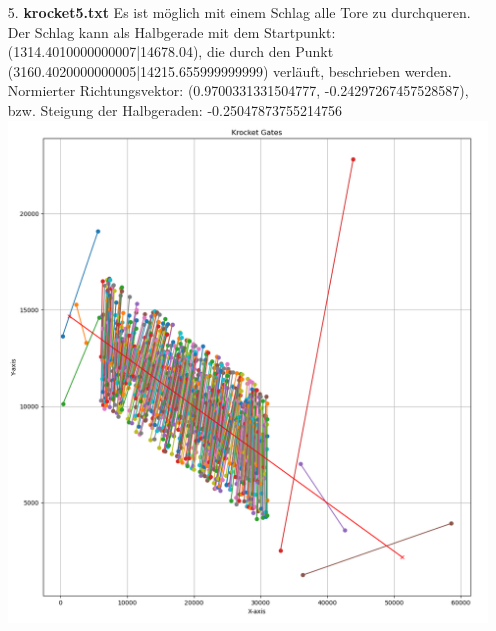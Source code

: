 \documentclass[a4paper,10pt,ngerman]{scrartcl}
\begin{document}
\begin{itemize}
  \item [5.] \textbf{krocket5.txt}
  \newline
  Es ist möglich mit einem Schlag alle Tore zu durchqueren.
  \newline
  Der Schlag kann als Halbgerade mit dem Startpunkt: (1314.4010000000007|14678.04), die durch den Punkt (3160.4020000000005|14215.655999999999) verläuft, beschrieben werden. 
  \newline
  Normierter Richtungsvektor: (0.9700331331504777, -0.24297267457528587), bzw. Steigung der Halbgeraden: -0.25047873755214756
  \newline
  \newline
  \includegraphics[scale=0.40]{krocket5.png}

\end{itemize}
\end{document}
